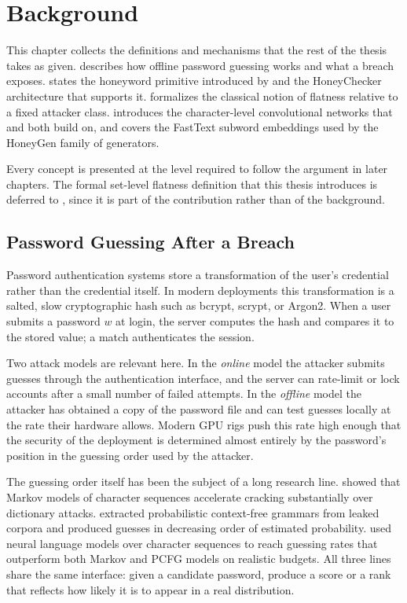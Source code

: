\chapter{Background}
\label{ch:background}

This chapter collects the definitions and mechanisms that the rest of
the thesis takes as given.  describes how offline
password guessing works and what a breach exposes.
 states the honeyword primitive introduced by
\textcite{juels2013honeywords} and the HoneyChecker architecture that
supports it.  formalizes the classical notion of
flatness relative to a fixed attacker class. 
introduces the character-level convolutional networks that
 and  both build on, and
 covers the FastText subword embeddings used by
the HoneyGen family of generators.

Every concept is presented at the level required to follow the
argument in later chapters. The formal set-level flatness definition
that this thesis introduces is deferred to ,
since it is part of the contribution rather than of the background.

\section{Password Guessing After a Breach}
\label{sec:bg-guessing}

Password authentication systems store a transformation of the user's
credential rather than the credential itself. In modern deployments
this transformation is a salted, slow cryptographic hash such as bcrypt,
scrypt, or Argon2. When a user submits a password $w$ at login, the
server computes the hash and compares it to the stored value; a match
authenticates the session.

Two attack models are relevant here. In the \emph{online} model the
attacker submits guesses through the authentication interface, and the
server can rate-limit or lock accounts after a small number of failed
attempts. In the \emph{offline} model the attacker has obtained a copy
of the password file and can test guesses locally at the rate their
hardware allows. Modern GPU rigs push this rate high enough that the
security of the deployment is determined almost entirely by the
password's position in the guessing order used by the attacker.

The guessing order itself has been the subject of a long research
line. \textcite{narayanan2005fast} showed that Markov models of
character sequences accelerate cracking substantially over dictionary
attacks. \textcite{weir2009pcfg} extracted probabilistic context-free
grammars from leaked corpora and produced guesses in decreasing order
of estimated probability. \textcite{melicher2016fast} used neural
language models over character sequences to reach guessing rates that
outperform both Markov and PCFG models on realistic budgets. All three
lines share the same interface: given a candidate password, produce a
score or a rank that reflects how likely it is to appear in a real
distribution.


